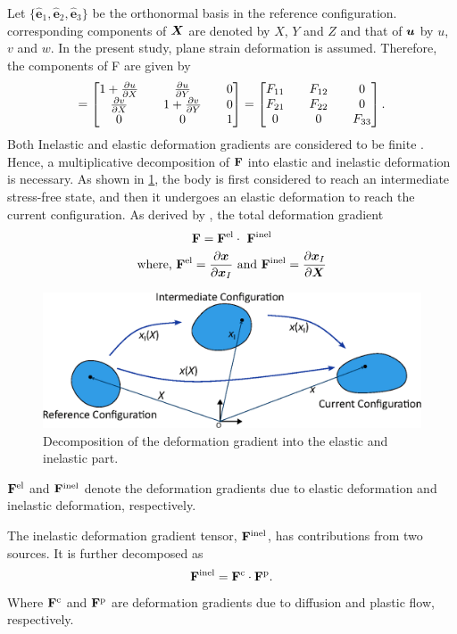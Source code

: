 Let $\{\hat{\bm{e}}_1, \hat{\bm{e}}_2, \hat{\bm{e}}_3\}$ be the orthonormal basis in the reference configuration. corresponding components of ${\bm{X}}$ are denoted by $X$, $Y$ and $Z$ and that of ${\bm{u}}$ by $u$, $v$ and $w$. In the present study, plane strain deformation is assumed. Therefore, the components of F are given by \citep{2009ContMechLai} 
\begin{align}
[\F] = 
\begin{bmatrix}
    1 + \pdiff{u}{X} && \pdiff{u}{Y} && 0 \\
    \pdiff{v}{X} && 1 + \pdiff{v}{Y} && 0 \\
    0 && 0 && 1
\end{bmatrix} = \tensor{F}. \label{eq:F_tensor}
\end{align}
Both Inelastic and elastic deformation gradients are considered to be finite \citep{2011JMPSBower}. Hence, a multiplicative decomposition of $\mathbf{F}$ into elastic and inelastic deformation is necessary. As shown in \ref{fig:decomposition}, the body is first considered to reach an intermediate stress-free state, and then it undergoes an elastic deformation to reach the current configuration. As derived by \citet{1969Lee}, the total deformation gradient   
\begin{gather}
\F = \F^{\el} \cdot  \F^{\inel} \label{eq:F_decomposition} \\
\text{where, } \F^{\el} = \pdiff{\x}{\x_I} \text{ and } \F^{\inel} = \pdiff{\x_{I}}{\X} \nonumber
\end{gather}
\begin{figure}[H]
    \centering
    \includegraphics[width=\textwidth]{figures/mathFormFigs/decomposition.eps}
    \caption{Decomposition of the deformation gradient into the elastic and inelastic part.}
    \label{fig:decomposition}
\end{figure}
$\mathbf{F}^{{\rm{el}}}$ and $\mathbf{F}^{{\rm{inel}}}$ denote the deformation gradients due to elastic deformation and inelastic deformation, respectively.

The inelastic deformation gradient tensor, $\mathbf{F}^{{\rm{inel}}}$, has contributions from two sources. It is further decomposed as 
\begin{gather}
    \mathbf{F}^{\rm{inel}} = \mathbf{F}^{\rm{c}} \cdot \mathbf{F}^{\rm{p}}. \label{eq:Finel_decomposition}
\end{gather}
Where $\mathbf{F}^{\rm{c}}$ and $\mathbf{F}^{\rm{p}}$ are deformation gradients due to diffusion and plastic flow, respectively.

